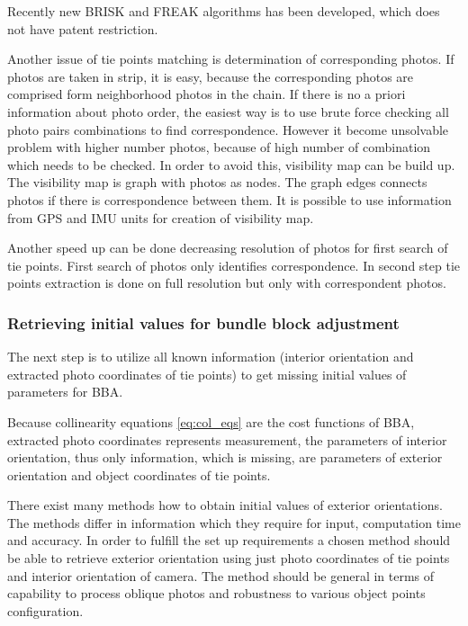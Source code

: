\documentclass[a4paper,12pt]{article}
\begin{document}
Recently new BRISK \cite{leutenegger2011brisk} and FREAK \cite{alahi2012freak} algorithms
has been developed, which does not have patent restriction. 

Another issue of tie points matching is determination of corresponding photos. 
If photos are taken in strip, it is easy, because the corresponding photos are comprised form neighborhood photos 
in the chain.
If there is no a priori information about photo order, the easiest way is to use brute force 
checking all photo pairs combinations to find correspondence.
However it become unsolvable problem with higher number photos, because 
of high number of combination which needs to be checked. In order to avoid this, visibility map \cite{barazzetti2010extraction} can be build up. 
The visibility map is graph with photos as nodes. The graph edges connects photos if there is
correspondence between them.  It is possible to use information from GPS and IMU units for creation of visibility map.

Another speed up can be done decreasing resolution of photos 
for first search of tie points. First search of photos only identifies correspondence.
In second step tie points extraction is done on full resolution but only with correspondent photos.

\subsubsection{Retrieving initial values for bundle block adjustment}

The next step is to utilize all known information (interior orientation and extracted 
photo coordinates of tie points) to get missing initial values of parameters for BBA. 

Because collinearity equations \ref{eq:col_eqs} are the cost functions of BBA,
extracted photo coordinates represents measurement,
the parameters of interior orientation, thus only information, 
which is missing, are parameters of exterior orientation and object coordinates of 
tie points. 

There exist many methods how to obtain initial values of exterior orientations. The methods 
differ in information which they require for input, computation time and accuracy. 
In order to fulfill the set up requirements a chosen method should be able to retrieve exterior orientation 
using just photo coordinates of tie points and interior orientation of camera. The method 
should be general in terms of capability to process oblique photos and robustness to 
various object points configuration.
\end{document}
